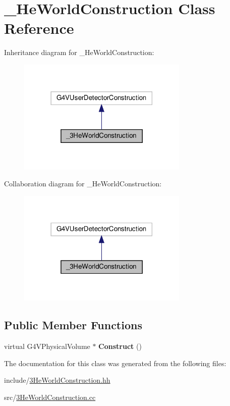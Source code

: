 \hypertarget{class__3HeWorldConstruction}{}\section{\+\_\+He\+World\+Construction Class Reference}
\label{class__3HeWorldConstruction}


Inheritance diagram for \+\_\+He\+World\+Construction\+:
\nopagebreak
\begin{figure}[H]
\begin{center}
\leavevmode
\includegraphics[width=230pt]{class__3HeWorldConstruction__inherit__graph}
\end{center}
\end{figure}


Collaboration diagram for \+\_\+He\+World\+Construction\+:
\nopagebreak
\begin{figure}[H]
\begin{center}
\leavevmode
\includegraphics[width=230pt]{class__3HeWorldConstruction__coll__graph}
\end{center}
\end{figure}
\subsection*{Public Member Functions}
\begin{DoxyCompactItemize}
\item 
\mbox{\label{class__3HeWorldConstruction_a123c069f0c962487d3dcb9e2f8dbc0b3}} 
virtual G4\+V\+Physical\+Volume $\ast$ {\bfseries Construct} ()
\end{DoxyCompactItemize}


The documentation for this class was generated from the following files\+:\begin{DoxyCompactItemize}
\item 
include/\hyperlink{3HeWorldConstruction_8hh}{3\+He\+World\+Construction.\+hh}\item 
src/\hyperlink{3HeWorldConstruction_8cc}{3\+He\+World\+Construction.\+cc}\end{DoxyCompactItemize}
